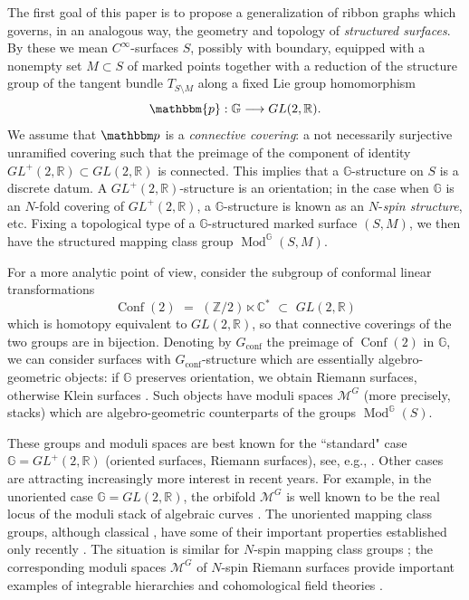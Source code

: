 \documentclass[english,11pt,leqno]{article}
\def\CC{\mathbb{C}}
\def\GG{\mathbb{G}}
\def\RR{\mathbb{R}}
\def\ZZ{\mathbb{Z}}
\def\Mc{\mathcal{M}}
\def\conf{{\on{conf}}}
\def\Mod{\operatorname{Mod}}
\def\on{\operatorname}
\def\lra{\longrightarrow}
\def\p{\mathbbm{p}}
\theoremstyle{definition}
\theoremstyle{remark}
\numberwithin{equation}{section}
\begin{document}
The first goal of this paper is to propose a generalization of ribbon graphs which governs, in an
analogous way, the geometry and topology of {\em structured surfaces}. By these we mean
$C^\infty$-surfaces $S$, possibly with boundary, equipped with a nonempty set $M \subset S$ of
marked points together with a reduction of the structure group of the tangent bundle
$T_{S\setminus M}$ along a fixed Lie group homomorphism
\begin{equation}
  \label{eq:GG} { \p}: \GG \lra GL(2,\RR).
\end{equation}
We assume that $\mathbbm p$ is a {\em connective covering}: a not necessarily surjective unramified covering
such that the preimage of the component of identity $GL^+(2,\RR) \subset GL(2,\RR)$ is connected. 
This implies that a $\GG$-structure on $S$ is a discrete datum. A $GL^+(2,\RR)$-structure is an orientation; 
in the case when $\GG$ is an $N$-fold covering of $GL^+(2,\RR)$, a $\GG$-structure is known
as an $N$-{\em spin structure}, etc. Fixing a topological type of a $\GG$-structured marked surface
$(S,M)$, we then have the structured mapping class group $\Mod^\GG(S,M)$. 

For a more analytic point of view, consider the subgroup of conformal linear transformations
\[
\on{Conf}(2) \,\,=\,\, (\ZZ/2)\ltimes \CC^* \,\,\subset \,\, GL(2,\RR)
\]
which is homotopy equivalent to $GL(2,\RR)$, so that connective coverings of the two groups are in bijection.
Denoting by $G_\conf$ the preimage of $\on{Conf}(2)$ in $\GG$, we can consider surfaces with
$G_\conf$-structure which are essentially algebro-geometric objects: if $\GG$
preserves orientation, we obtain Riemann surfaces, otherwise Klein surfaces \cite{alling-greenleaf}.
Such objects have moduli spaces $\Mc^G$ (more precisely, stacks) which are algebro-geometric
counterparts of the groups $\Mod^\GG(S)$. 

These groups and moduli spaces are best known for the ``standard" case $\GG=GL^+(2,\RR)$ (oriented
surfaces, Riemann surfaces), see, e.g., \cite{farb-margalit}. Other cases are attracting
increasingly more interest in recent years. For example, in the unoriented case $\GG=GL(2,\RR)$,
the orbifold $\Mc^G$ is well known to be  the real locus of the moduli stack of algebraic curves
\cite{natanzon, seppala-sorvali, liu}. 
The unoriented mapping class groups, although classical \cite {mangler, singerman, birman-chillinworth},
have some of their important properties established only recently \cite {randal-williams:nonorient, wahl}. 
The situation is similar for $N$-spin mapping class groups \cite{randal-williams:spin}; the corresponding moduli
spaces $\Mc^G$ of $N$-spin Riemann surfaces \cite{jarvis} provide important examples of integrable hierarchies
and cohomological field theories \cite{jarvis-kimura-vaintrob}.\\ 
\end{document}
